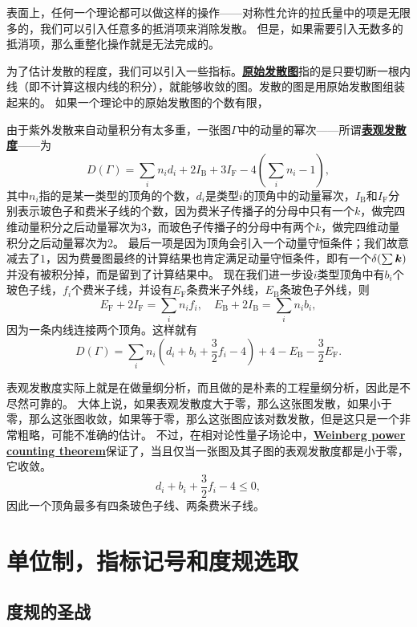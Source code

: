 \documentclass[hyperref, UTF8, a4paper]{ctexart}
\newcommand{\concept}[1]{\underline{\textbf{#1}}}
\begin{document}
表面上，任何一个理论都可以做这样的操作——对称性允许的拉氏量中的项是无限多的，我们可以引入任意多的抵消项来消除发散。
但是，如果需要引入无数多的抵消项，那么重整化操作就是无法完成的。

为了估计发散的程度，我们可以引入一些指标。\concept{原始发散图}指的是只要切断一根内线（即不计算这根内线的积分），就能够收敛的图。发散的图是用原始发散图组装起来的。
如果一个理论中的原始发散图的个数有限，

由于紫外发散来自动量积分有太多重，一张图$\Gamma$中的动量的幂次——所谓\concept{表观发散度}——为
\begin{equation}
    D(\Gamma) = \sum_i n_i d_i + 2 I_\text{B} + 3 I_\text{F} - 4(\sum_i n_i - 1),
\end{equation}
其中$n_i$指的是某一类型的顶角的个数，$d_i$是类型$i$的顶角中的动量幂次，$I_\text{B}$和$I_\text{F}$分别表示玻色子和费米子线的个数，因为费米子传播子的分母中只有一个$k$，做完四维动量积分之后动量幂次为3，而玻色子传播子的分母中有两个$k$，做完四维动量积分之后动量幂次为2。
最后一项是因为顶角会引入一个动量守恒条件；我们故意减去了$1$，因为费曼图最终的计算结果也肯定满足动量守恒条件，即有一个$\delta(\sum \vb*{k})$并没有被积分掉，而是留到了计算结果中。
现在我们进一步设$i$类型顶角中有$b_i$个玻色子线，$f_i$个费米子线，并设有$E_\text{F}$条费米子外线，$E_\text{B}$条玻色子外线，则
\[
    E_\text{F} + 2 I_\text{F} = \sum_i n_i f_i, \quad E_\text{B} + 2 I_\text{B} = \sum_i n_i b_i,
\]
因为一条内线连接两个顶角。这样就有
\begin{equation}
    D(\Gamma) = \sum_i n_i \left( d_i + b_i + \frac{3}{2} f_i - 4  \right) + 4 - E_\text{B} - \frac{3}{2} E_\text{F}.
\end{equation}

表观发散度实际上就是在做量纲分析，而且做的是朴素的工程量纲分析，因此是不尽然可靠的。
大体上说，如果表观发散度大于零，那么这张图发散，如果小于零，那么这张图收敛，如果等于零，那么这张图应该对数发散，但是这只是一个非常粗略，可能不准确的估计。
不过，在相对论性量子场论中，\concept{Weinberg power counting theorem}保证了，当且仅当一张图及其子图的表观发散度都是小于零，它收敛。
\begin{equation}
    d_i + b_i + \frac{3}{2} f_i - 4 \leq 0,
\end{equation}
因此一个顶角最多有四条玻色子线、两条费米子线。

\section{单位制，指标记号和度规选取}

\subsection{度规的圣战}
\end{document}
